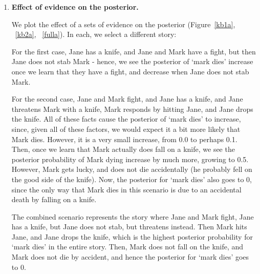 \begin{enumerate}
\item \textbf{Effect of evidence on the posterior.}

We plot the effect of a sets of evidence on the posterior (Figure~\ref{kb1a}, ~\ref{kb2a}, ~\ref{fulla}). In each, we select a different story: 

For the first case, Jane has a knife, and Jane and Mark have a fight, but then Jane does not stab Mark - hence, we see the posterior of `mark dies' increase once we learn that they have a fight, and decrease when Jane does not stab Mark.

For the second case, Jane and Mark fight, and Jane has a knife, and Jane threatens Mark with a knife, Mark responds by hitting Jane, and Jane drops the knife. All of these facts cause the posterior of `mark dies' to increase, since, given all of these factors, we would expect it a bit more likely that Mark dies. However, it is a very small increase, from 0.0 to perhaps 0.1. Then, once we learn that Mark actually does fall on a knife, we see the posterior probability of Mark dying increase by much more, growing to 0.5. However, Mark gets lucky, and does not die accidentally (he probably fell on the good side of the knife). Now, the posterior for `mark dies' also goes to 0, since the only way that Mark dies in this scenario is due to an accidental death by falling on a knife. 

The combined scenario represents the story where Jane and Mark fight, Jane has a knife, but Jane does not stab, but threatens instead. Then Mark hits Jane, and Jane drops the knife, which is the highest posterior probability for `mark dies' in the entire story. Then, Mark does not fall on the knife, and Mark does not die by accident, and hence the posterior for `mark dies' goes to 0.


\end{enumerate}
